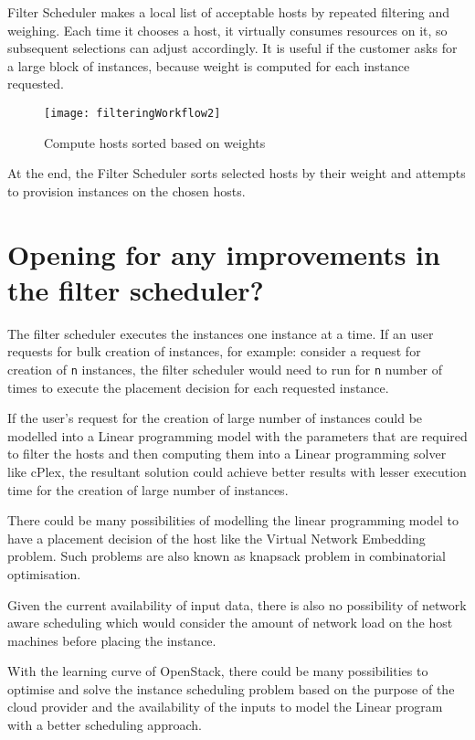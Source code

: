Filter Scheduler makes a local list of acceptable hosts by repeated filtering and weighing.
Each time it chooses a host, it virtually consumes resources on it, so subsequent selections can adjust accordingly.
It is useful if the customer asks for a large block of instances, because weight is computed for each instance requested.

\begin{figure}[H]
	\begin{center}
		\texttt{[image: filteringWorkflow2]}
		\caption{Compute hosts sorted based on weights\cite{OpenStack:filteringWorkflow2}}\label{fig:filteringWorkflow2}
	\end{center}
	\vspace{-10pt}
\end{figure}

At the end, the Filter Scheduler sorts selected hosts by their weight and attempts to provision instances on the chosen hosts.

\section{Opening for any improvements in the filter scheduler?}\label{sec:openingforimprovement}
The filter scheduler executes the instances one instance at a time.
If an user requests for bulk creation of instances, for example: consider a request for creation of \verb|n| instances, the filter scheduler would need to run for \verb|n| number of times to execute the placement decision for each requested instance.

If the user's request for the creation of large number of instances could be modelled into a Linear programming model with the parameters that are required to filter the hosts and then computing them into a Linear programming solver like cPlex, the resultant solution could achieve better results with lesser execution time for the creation of large number of instances.

There could be many possibilities of modelling the linear programming model to have a placement decision of the host like the Virtual Network Embedding problem.
Such problems are also known as knapsack problem in combinatorial optimisation.

Given the current availability of input data, there is also no possibility of network aware scheduling which would consider the amount of network load on the host machines before placing the instance.

With the learning curve of OpenStack, there could be many possibilities to optimise and solve the instance scheduling problem based on the purpose of the cloud provider and the availability of the inputs to model the Linear program with a better scheduling approach.

